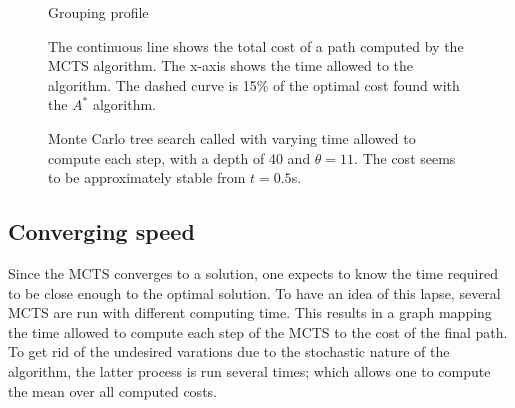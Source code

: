 \documentclass[oneside,twocolumn]{article}
\begin{document}
\begin{figure}
  \caption{Grouping profile}\label{fig:grouping}
\end{figure}
\begin{figure}
  \caption{The continuous line shows the total cost of a path computed by the
    MCTS algorithm. The x-axis shows the time allowed to the algorithm. The
    dashed curve is 15\% of the optimal cost found with the \(A^*\)
  algorithm.}\label{fig:longterm}
\end{figure}
\begin{figure}
  \caption{Monte Carlo tree search called with varying time allowed to compute
  each step, with a depth of 40 and \(\theta = 11\). The cost seems to be
  approximately stable from \(t=0.5\)s.}\label{fig:shortterm}
\end{figure}


\subsection{Converging speed}
Since the MCTS converges to a solution, one expects to know the time required to
be close enough to the optimal solution. To have an idea of this lapse, several
MCTS are run with different computing time. This results in a graph mapping the
time allowed to compute each step of the MCTS to the cost of the final path. To
get rid of the undesired varations due to the stochastic nature of the
algorithm, the latter process is run several times; which allows one to compute
the mean over all computed costs.
\end{document}
